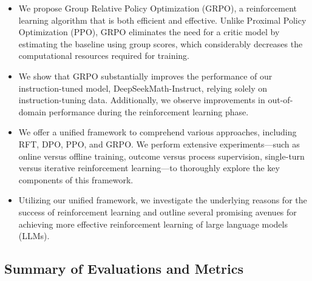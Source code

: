 \begin{itemize}[topsep=0pt]
    \item We propose Group Relative Policy Optimization (GRPO), a reinforcement learning algorithm that is both efficient and effective. Unlike Proximal Policy Optimization (PPO), GRPO eliminates the need for a critic model by estimating the baseline using group scores, which considerably decreases the computational resources required for training.
    \item We show that GRPO substantially improves the performance of our instruction-tuned model, DeepSeekMath-Instruct, relying solely on instruction-tuning data. Additionally, we observe improvements in out-of-domain performance during the reinforcement learning phase.
    \item We offer a unified framework to comprehend various approaches, including RFT, DPO, PPO, and GRPO. We perform extensive experiments—such as online versus offline training, outcome versus process supervision, single-turn versus iterative reinforcement learning—to thoroughly explore the key components of this framework.
    \item Utilizing our unified framework, we investigate the underlying reasons for the success of reinforcement learning and outline several promising avenues for achieving more effective reinforcement learning of large language models (LLMs).
\end{itemize}

\subsection{Summary of Evaluations and Metrics}

